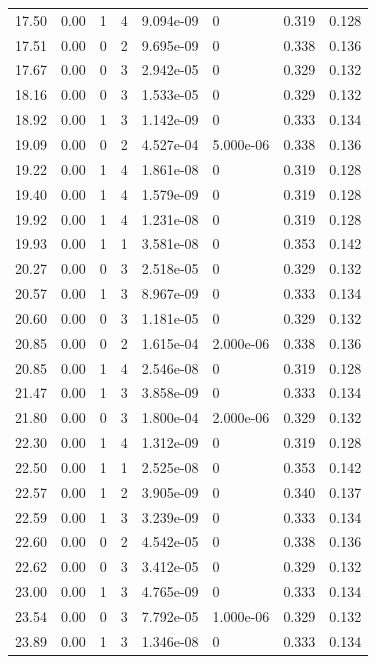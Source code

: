 \documentclass[preview]{standalone}
\begin{document}
{{{\begin{tabular}{L{1.2cm}C{1.2cm} C{0.3cm}C{0.5cm} C{1.4cm}C{1.4cm} C{1.4cm}C{1.4cm}}
  17.50  &  0.00  & 1     &  4 &  9.094e-09  & 0  & 0.319 &  0.128   \\ 
  17.51  &  0.00  & 0     &  2 &  9.695e-09  & 0  & 0.338 &  0.136   \\ 
  17.67  &  0.00  & 0     &  3 &  2.942e-05  & 0  & 0.329 &  0.132   \\ 
  18.16  &  0.00  & 0     &  3 &  1.533e-05  & 0  & 0.329 &  0.132   \\ 
  18.92  &  0.00  & 1     &  3 &  1.142e-09  & 0  & 0.333 &  0.134   \\ 
  19.09  &  0.00  & 0     &  2 &  4.527e-04  & 5.000e-06  & 0.338 &  0.136   \\ 
  19.22  &  0.00  & 1     &  4 &  1.861e-08  & 0  & 0.319 &  0.128   \\ 
  19.40  &  0.00  & 1     &  4 &  1.579e-09  & 0  & 0.319 &  0.128   \\ 
  19.92  &  0.00  & 1     &  4 &  1.231e-08  & 0  & 0.319 &  0.128   \\ 
  19.93  &  0.00  & 1     &  1 &  3.581e-08  & 0  & 0.353 &  0.142   \\ 
  20.27  &  0.00  & 0     &  3 &  2.518e-05  & 0  & 0.329 &  0.132   \\ 
  20.57  &  0.00  & 1     &  3 &  8.967e-09  & 0  & 0.333 &  0.134   \\ 
  20.60  &  0.00  & 0     &  3 &  1.181e-05  & 0  & 0.329 &  0.132   \\ 
  20.85  &  0.00  & 0     &  2 &  1.615e-04  & 2.000e-06  & 0.338 &  0.136   \\ 
  20.85  &  0.00  & 1     &  4 &  2.546e-08  & 0  & 0.319 &  0.128   \\ 
  21.47  &  0.00  & 1     &  3 &  3.858e-09  & 0  & 0.333 &  0.134   \\ 
  21.80  &  0.00  & 0     &  3 &  1.800e-04  & 2.000e-06  & 0.329 &  0.132   \\ 
  22.30  &  0.00  & 1     &  4 &  1.312e-09  & 0  & 0.319 &  0.128   \\ 
  22.50  &  0.00  & 1     &  1 &  2.525e-08  & 0  & 0.353 &  0.142   \\ 
  22.57  &  0.00  & 1     &  2 &  3.905e-09  & 0  & 0.340 &  0.137   \\ 
  22.59  &  0.00  & 1     &  3 &  3.239e-09  & 0  & 0.333 &  0.134   \\ 
  22.60  &  0.00  & 0     &  2 &  4.542e-05  & 0  & 0.338 &  0.136   \\ 
  22.62  &  0.00  & 0     &  3 &  3.412e-05  & 0  & 0.329 &  0.132   \\ 
  23.00  &  0.00  & 1     &  3 &  4.765e-09  & 0  & 0.333 &  0.134   \\ 
  23.54  &  0.00  & 0     &  3 &  7.792e-05  & 1.000e-06  & 0.329 &  0.132   \\ 
  23.89  &  0.00  & 1     &  3 &  1.346e-08  & 0  & 0.333 &  0.134   \\ 
\hline 
\end{tabular} 

}}}
\end{document}
